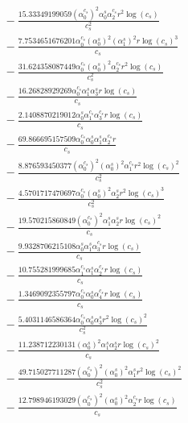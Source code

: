 \documentclass[10pt]{article}
\begin{document}
\begin{align*}
&{}  - \frac{15.33349199059 \left(\alpha_{0}^{c_s}\right)^{2} \alpha_{0}^s \alpha_{2}^{c_s} r^{2} \log{\left(c_{s} \right)}}{c_{s}^{2}} \\
&{}  - \frac{7.7534651676201 \alpha_{0}^{c_s} \left(\alpha_{0}^s\right)^{2} \left(\alpha_{1}^s\right)^{2} r \log{\left(c_{s} \right)}^{3}}{c_{s}} \\
&{}  - \frac{31.624358087449 \alpha_{0}^{c_s} \left(\alpha_{0}^s\right)^{2} \alpha_{2}^{c_s} r^{2} \log{\left(c_{s} \right)}}{c_{s}^{2}} \\
&{}  - \frac{16.26828929269 \alpha_{0}^{c_s} \alpha_{1}^s \alpha_{3}^s r \log{\left(c_{s} \right)}}{c_{s}} \\
&{}  - \frac{2.1408870219012 \alpha_{0}^s \alpha_{1}^{c_s} \alpha_{3}^{c_s} r \log{\left(c_{s} \right)}}{c_{s}} \\
&{}  - \frac{69.866695157509 \alpha_{0}^{c_s} \alpha_{0}^s \alpha_{1}^s \alpha_{2}^{c_s} r}{c_{s}} \\
&{}  - \frac{8.876593450377 \left(\alpha_{0}^{c_s}\right)^{2} \left(\alpha_{0}^s\right)^{2} \alpha_{1}^{c_s} r^{2} \log{\left(c_{s} \right)}^{2}}{c_{s}^{2}} \\
&{}  - \frac{4.5701717470697 \alpha_{0}^{c_s} \left(\alpha_{0}^s\right)^{2} \alpha_{2}^s r^{2} \log{\left(c_{s} \right)}^{3}}{c_{s}^{2}} \\
&{}  - \frac{19.570215860849 \left(\alpha_{0}^{c_s}\right)^{2} \alpha_{1}^s \alpha_{2}^s r \log{\left(c_{s} \right)}^{2}}{c_{s}} \\
&{}  - \frac{9.9328706215108 \alpha_{0}^s \alpha_{1}^s \alpha_{3}^{c_s} r \log{\left(c_{s} \right)}}{c_{s}} \\
&{}  - \frac{10.755281999685 \alpha_{1}^{c_s} \alpha_{1}^s \alpha_{2}^{c_s} r \log{\left(c_{s} \right)}}{c_{s}} \\
&{}  - \frac{1.3469092355797 \alpha_{0}^{c_s} \alpha_{0}^s \alpha_{4}^{c_s} r \log{\left(c_{s} \right)}}{c_{s}} \\
&{}  - \frac{5.4031146586364 \alpha_{0}^{c_s} \alpha_{0}^s \alpha_{3}^s r^{2} \log{\left(c_{s} \right)}^{2}}{c_{s}^{2}} \\
&{}  - \frac{11.238712230131 \left(\alpha_{0}^s\right)^{2} \alpha_{1}^s \alpha_{2}^s r \log{\left(c_{s} \right)}^{2}}{c_{s}} \\
&{}  - \frac{49.715027711287 \left(\alpha_{0}^{c_s}\right)^{2} \left(\alpha_{0}^s\right)^{2} \alpha_{1}^s r^{2} \log{\left(c_{s} \right)}^{2}}{c_{s}^{2}} \\
&{}  - \frac{12.798946193029 \left(\alpha_{0}^{c_s}\right)^{2} \left(\alpha_{0}^s\right)^{2} \alpha_{2}^{c_s} r \log{\left(c_{s} \right)}}{c_{s}} \\

\end{align*}
\end{document}
